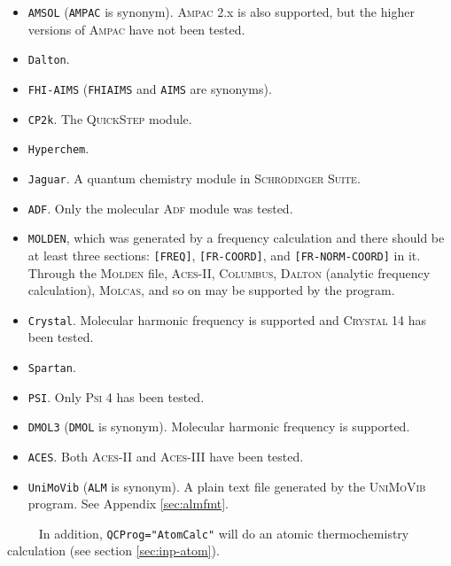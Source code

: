 \documentclass[12pt,english]{extarticle}
\begin{document}
\begin{itemize}
\item \verb|AMSOL| (\verb|AMPAC| is synonym). \textsc{Ampac} 2.x is also supported, but the higher versions of \textsc{Ampac} have not been tested.
\item \verb|Dalton|.
\item \verb|FHI-AIMS| (\verb|FHIAIMS| and \verb|AIMS| are synonyms).
\item \verb|CP2k|. The \textsc{QuickStep} module.
\item \verb|Hyperchem|.
\item \verb|Jaguar|. A quantum chemistry module in \textsc{Schr\"odinger Suite}.
\item \verb|ADF|. Only the molecular \textsc{Adf} module was tested.
\item \verb|MOLDEN|, which was generated by a frequency calculation and there should be at
least three sections: \verb|[FREQ]|, \verb|[FR-COORD]|, and \verb|[FR-NORM-COORD]| in it. Through the
\textsc{Molden} file, \textsc{Aces-II}, \textsc{Columbus}, \textsc{Dalton} (analytic frequency calculation), \textsc{Molcas}, and so on may be supported by the program.
\item \verb|Crystal|. Molecular harmonic frequency is supported and \textsc{Crystal} 14 has been tested.
\item \verb|Spartan|.
\item \verb|PSI|. Only \textsc{Psi} 4 has been tested.
\item \verb|DMOL3| (\verb|DMOL| is synonym). Molecular harmonic frequency is supported.
\item \verb|ACES|. Both \textsc{Aces-II} and \textsc{Aces-III} have been tested.
\item \verb|UniMoVib| (\verb|ALM| is synonym). A plain text file generated by the \textsc{UniMoVib} program. See Appendix \ref{sec:almfmt}.
\end{itemize}
\verb|     |In addition, \verb|QCProg="AtomCalc"| will do an atomic thermochemistry calculation (see section \ref{sec:inp-atom}).
\end{document}
